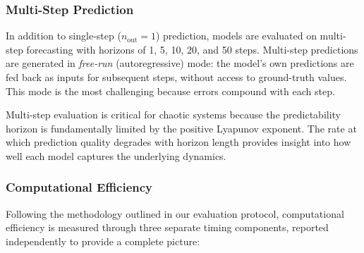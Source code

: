 \subsubsection{Multi-Step Prediction}
\label{sec:multi_step}

In addition to single-step ($n_{\text{out}} = 1$) prediction, models are evaluated on multi-step forecasting with horizons of 1, 5, 10, 20, and 50 steps. Multi-step predictions are generated in \emph{free-run} (autoregressive) mode: the model's own predictions are fed back as inputs for subsequent steps, without access to ground-truth values. This mode is the most challenging because errors compound with each step.

Multi-step evaluation is critical for chaotic systems because the predictability horizon is fundamentally limited by the positive Lyapunov exponent. The rate at which prediction quality degrades with horizon length provides insight into how well each model captures the underlying dynamics.

\subsubsection{Computational Efficiency}
\label{sec:efficiency_metrics}

Following the methodology outlined in our evaluation protocol, computational efficiency is measured through three separate timing components, reported independently to provide a complete picture:


